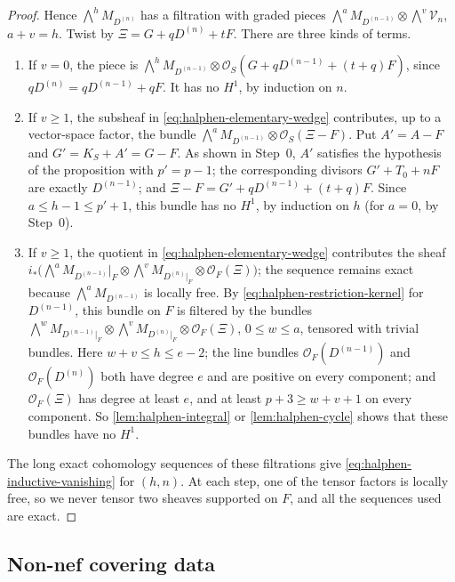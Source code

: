 \documentclass[11pt,reqno]{amsart}
\numberwithin{equation}{section}
\theoremstyle{remark}
\newcommand{\sshf}[1]{\mathcal{O}_{#1}}
\newcommand{\shf}[1]{\mathscr{#1}}
\begin{document}
\begin{proof}
Hence \(\bigwedge^hM_{D^{(n)}}\) has a filtration with graded pieces \(\bigwedge^aM_{D^{(n-1)}}\otimes\bigwedge^v\shf{V}_n\), \(a+v=h\). Twist by \(\Xi=G+qD^{(n)}+tF\). There are three kinds of terms.
\begin{enumerate}
\item[(a)] If \(v=0\), the piece is \(\bigwedge^hM_{D^{(n-1)}}\otimes\sshf{S}(G+qD^{(n-1)}+(t+q)F)\), since \(qD^{(n)}=qD^{(n-1)}+qF\). It has no \(H^1\), by induction on \(n\).
\item[(b)] If \(v\geq1\), the subsheaf in \eqref{eq:halphen-elementary-wedge} contributes, up to a vector-space factor, the bundle \(\bigwedge^aM_{D^{(n-1)}}\otimes\sshf{S}(\Xi-F)\). Put \(A'=A-F\) and \(G'=K_S+A'=G-F\). As shown in Step~0, \(A'\) satisfies the hypothesis of the proposition with \(p'=p-1\); the corresponding divisors \(G'+T_0+nF\) are exactly \(D^{(n-1)}\); and \(\Xi-F=G'+qD^{(n-1)}+(t+q)F\). Since \(a\leq h-1\leq p'+1\), this bundle has no \(H^1\), by induction on \(h\) (for \(a=0\), by Step~0).
\item[(c)] If \(v\geq1\), the quotient in \eqref{eq:halphen-elementary-wedge} contributes the sheaf \(i_*\bigl(\bigwedge^aM_{D^{(n-1)}}|_F\otimes\bigwedge^vM_{D^{(n)}|_F}\otimes\sshf{F}(\Xi)\bigr)\); the sequence remains exact because \(\bigwedge^aM_{D^{(n-1)}}\) is locally free. By \eqref{eq:halphen-restriction-kernel} for \(D^{(n-1)}\), this bundle on \(F\) is filtered by the bundles \(\bigwedge^wM_{D^{(n-1)}|_F}\otimes\bigwedge^vM_{D^{(n)}|_F}\otimes\sshf{F}(\Xi)\), \(0\leq w\leq a\), tensored with trivial bundles. Here \(w+v\leq h\leq e-2\); the line bundles \(\sshf{F}(D^{(n-1)})\) and \(\sshf{F}(D^{(n)})\) both have degree \(e\) and are positive on every component; and \(\sshf{F}(\Xi)\) has degree at least \(e\), and at least \(p+3\geq w+v+1\) on every component. So \cref{lem:halphen-integral} or \cref{lem:halphen-cycle} shows that these bundles have no \(H^1\).
\end{enumerate}
The long exact cohomology sequences of these filtrations give \eqref{eq:halphen-inductive-vanishing} for \((h,n)\). At each step, one of the tensor factors is locally free, so we never tensor two sheaves supported on \(F\), and all the sequences used are exact.
\end{proof}

\subsection{Non-nef covering data}
\end{document}
